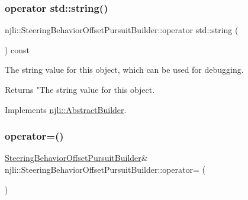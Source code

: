 \subsubsection{\texorpdfstring{operator std\+::string()}{operator std::string()}}
{\footnotesize\ttfamily njli\+::\+Steering\+Behavior\+Offset\+Pursuit\+Builder\+::operator std\+::string (\begin{DoxyParamCaption}{ }\end{DoxyParamCaption}) const\hspace{0.3cm}{\ttfamily [virtual]}}

The string value for this object, which can be used for debugging.

\begin{DoxyReturn}{Returns}
"The string value for this object. 
\end{DoxyReturn}


Implements \mbox{\hyperlink{classnjli_1_1_abstract_builder_a3e6e553e06d1ca30517ad5fb0bd4d000}{njli\+::\+Abstract\+Builder}}.

\mbox{\label{classnjli_1_1_steering_behavior_offset_pursuit_builder_a1d878fffed3543bd244225ed8f8f40ae}} 
\subsubsection{\texorpdfstring{operator=()}{operator=()}}
{\footnotesize\ttfamily \mbox{\hyperlink{classnjli_1_1_steering_behavior_offset_pursuit_builder}{Steering\+Behavior\+Offset\+Pursuit\+Builder}}\& njli\+::\+Steering\+Behavior\+Offset\+Pursuit\+Builder\+::operator= (\begin{DoxyParamCaption}\item[{const \mbox{\hyperlink{classnjli_1_1_steering_behavior_offset_pursuit_builder}{Steering\+Behavior\+Offset\+Pursuit\+Builder}} \&}]{ }\end{DoxyParamCaption})\hspace{0.3cm}{\ttfamily [protected]}}

\mbox{\label{classnjli_1_1_steering_behavior_offset_pursuit_builder_a5d798873d91fc0a4d987b816e79e2cdd}} 
